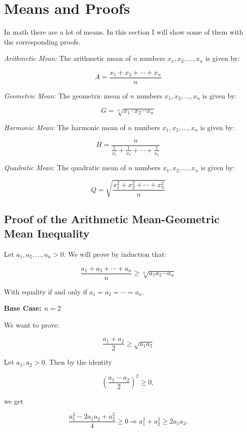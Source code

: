 \newpage
\section{Means and Proofs}
In math there are a lot of means. In this section I will show some of them with the corresponding proofs.

\emph{Arithmetic Mean:} The arithmetic mean of \(n\) numbers \( x_1, x_2, \dots, x_n \) is given by:

\[
	A = \frac{x_1 + x_2 + \cdots + x_n}{n}
\]

\emph{Geometric Mean:} The geometric mean of \(n\) numbers \( x_1, x_2, \dots, x_n \) is given by:

\[
	G = \sqrt[n]{x_1 \cdot x_2 \cdots x_n}
\]

\emph{Harmonic Mean:} The harmonic mean of \(n\) numbers \( x_1, x_2, \dots, x_n \) is given by:

\[
	H = \frac{n}{\frac{1}{x_1} + \frac{1}{x_2} + \cdots + \frac{1}{x_n}}
\]

\emph{Quadratic Mean:} The quadratic mean of \(n\) numbers \( x_1, x_2, \dots, x_n \) is given by:
	      
\[
	Q = \sqrt{\frac{x_1^2 + x_2^2 + \cdots + x_n^2}{n}}
\]

\subsection{Proof of the Arithmetic Mean-Geometric Mean Inequality}

Let \( a_1, a_2, \dots, a_n > 0 \). We will prove by induction that:

\[
	\frac{a_1 + a_2 + \cdots + a_n}{n} \geq \sqrt[n]{a_1 a_2 \cdots a_n}
\]

With equality if and only if \( a_1 = a_2 = \cdots = a_n \).
\vspace{\baselineskip}

\textbf{Base Case: \( n = 2 \)}
\vspace{\baselineskip}

We want to prove:

\[
	\frac{a_1 + a_2}{2} \geq \sqrt{a_1 a_2}
\]

Let \( a_1, a_2 > 0 \). Then by the identity

\[
	{\left( \frac{a_1 - a_2}{2} \right)}^2 \geq 0,
\]

we get

\[
	\frac{a_1^2 - 2a_1a_2 + a_2^2}{4} \geq 0 \Rightarrow a_1^2 + a_2^2 \geq 2a_1a_2.
\]

